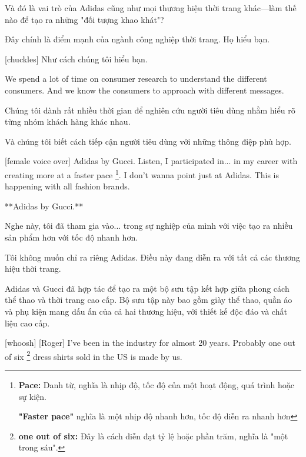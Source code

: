 \documentclass[a4paper]{article}
\begin{document}
	\begin{vietnamese-v2}
		
		Và đó là vai trò của Adidas cũng như mọi thương hiệu thời trang khác—làm thế nào để tạo ra những "đối tượng khao khát"?
		
		Đây chính là điểm mạnh của ngành công nghiệp thời trang. Họ hiểu bạn.
		
		[chuckles] Như cách chúng tôi hiểu bạn.
	\end{vietnamese-v2}
	
	We spend a lot of time on consumer research to understand the different consumers.
	And we know the consumers to approach with different messages.
	
	\begin{vietnamese-v2}
		Chúng tôi dành rất nhiều thời gian để nghiên cứu người tiêu dùng nhằm hiểu rõ từng nhóm khách hàng khác nhau.  
		
		Và chúng tôi biết cách tiếp cận người tiêu dùng với những thông điệp phù hợp.
	\end{vietnamese-v2}
	
	\pagebreak
	
	[female voice over] Adidas by Gucci.
	Listen, I participated in... in my career with creating more at a faster pace \footnote{
		\textbf{Pace:} Danh từ, nghĩa là nhịp độ, tốc độ của một hoạt động, quá trình hoặc sự kiện.
	
		\textbf{"Faster pace"} nghĩa là một nhịp độ nhanh hơn, tốc độ diễn ra nhanh hơn
	}.
	I don't wanna point just at Adidas. This is happening with all fashion brands.
	
	\begin{vietnamese-v2}
		[giọng nữ] **Adidas by Gucci.**  
		
		Nghe này, tôi đã tham gia vào... trong sự nghiệp của mình với việc tạo ra nhiều sản phẩm hơn với tốc độ nhanh hơn.  
		
		Tôi không muốn chỉ ra riêng Adidas. Điều này đang diễn ra với tất cả các thương hiệu thời trang.  
		
		Adidas và Gucci đã hợp tác để tạo ra một bộ sưu tập kết hợp giữa phong cách thể thao và thời trang cao cấp. Bộ sưu tập này bao gồm giày thể thao, quần áo và phụ kiện mang dấu ấn của cả hai thương hiệu, với thiết kế độc đáo và chất liệu cao cấp.
	\end{vietnamese-v2}
	
	[whoosh]
	[Roger] I've been in the industry for almost 20 years.
	Probably one out of six \footnote{
		\textbf{one out of six:} Đây là cách diễn đạt tỷ lệ hoặc phần trăm, nghĩa là "một trong sáu".
	
	} dress shirts sold in the US is made by us.
	
\end{document}
